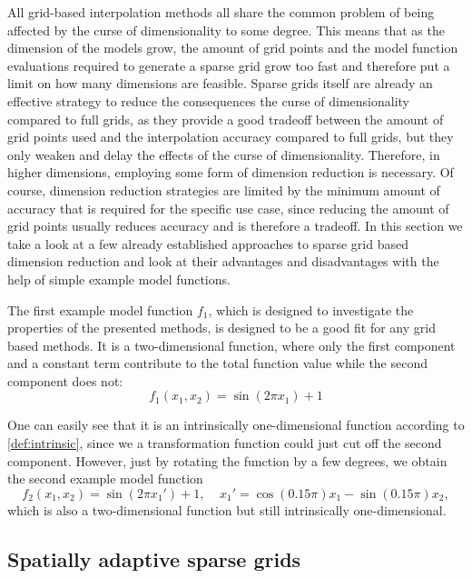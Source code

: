 \documentclass[
  a4paper,  %
  twoside,  %
  bibliography=totoc,
  headsepline,
  cleardoublepage=empty,
  parskip=half,
  draft=false
]{scrbook}
\begin{document}
All grid-based interpolation methods all share the common problem of being affected by the curse of dimensionality to some degree.
This means that as the dimension of the models grow, the amount of grid points and the model function evaluations required to generate a sparse grid grow too fast and therefore put a limit on how many dimensions are feasible.
Sparse grids itself are already an effective strategy to reduce the consequences the curse of dimensionality compared to full grids, as they provide a good tradeoff between the amount of grid points used and the interpolation accuracy compared to full grids, but they only weaken and delay the effects of the curse of dimensionality.
Therefore, in higher dimensions, employing some form of dimension reduction is necessary.
Of course, dimension reduction strategies are limited by the minimum amount of accuracy that is required for the specific use case, since reducing the amount of grid points usually reduces accuracy and is therefore a tradeoff.
In this section we take a look at a few already established approaches to sparse grid based dimension reduction and look at their advantages and disadvantages with the help of simple example model functions.

The first example model function $f_1$, which is designed to investigate the properties of the presented methods, is designed to be a good fit for any grid based methods.
It is a two-dimensional function, where only the first component and a constant term contribute to the total function value while the second component does not:
\begin{equation}
f_1(x_1, x_2)=\sin(2 \pi x_1) + 1
\nonumber
\end{equation}

One can easily see that it is an intrinsically one-dimensional function according to \cref{def:intrinsic}, since we a transformation function could just cut off the second component.
However, just by rotating the function by a few degrees, we obtain the second example model function
\begin{equation}
f_2(x_1,x_2)=\sin(2 \pi x_1') + 1, ~~~~~ x_1'=\cos(0.15 \pi) x_1 -\sin(0.15 \pi) x_2,
\end{equation}
which is also a two-dimensional function but still intrinsically one-dimensional.

\subsection{Spatially adaptive sparse grids}
\end{document}
